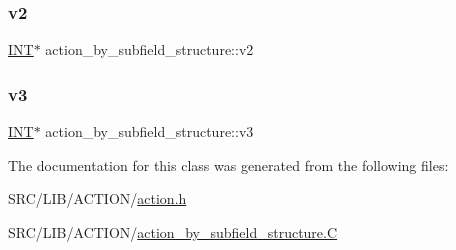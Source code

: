 \subsubsection{\texorpdfstring{v2}{v2}}
{\footnotesize\ttfamily \mbox{\hyperlink{galois_8h_a09fddde158a3a20bd2dcadb609de11dc}{I\+NT}}$\ast$ action\+\_\+by\+\_\+subfield\+\_\+structure\+::v2}

\mbox{\label{classaction__by__subfield__structure_a69d55c9171caef13df926f9121d7bb16}} 
\subsubsection{\texorpdfstring{v3}{v3}}
{\footnotesize\ttfamily \mbox{\hyperlink{galois_8h_a09fddde158a3a20bd2dcadb609de11dc}{I\+NT}}$\ast$ action\+\_\+by\+\_\+subfield\+\_\+structure\+::v3}



The documentation for this class was generated from the following files\+:\begin{DoxyCompactItemize}
\item 
S\+R\+C/\+L\+I\+B/\+A\+C\+T\+I\+O\+N/\mbox{\hyperlink{action_8h}{action.\+h}}\item 
S\+R\+C/\+L\+I\+B/\+A\+C\+T\+I\+O\+N/\mbox{\hyperlink{action__by__subfield__structure_8_c}{action\+\_\+by\+\_\+subfield\+\_\+structure.\+C}}\end{DoxyCompactItemize}

